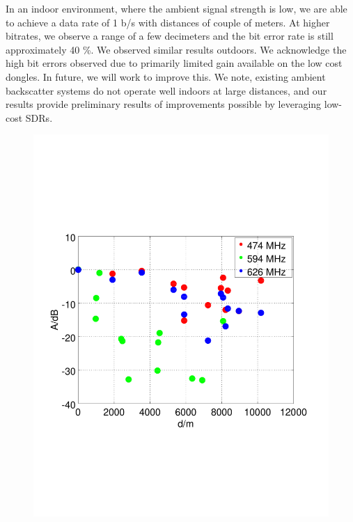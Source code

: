 In an indoor environment, where the ambient signal strength is low, we are
able to achieve a data rate of 1 b/s with distances of
couple of meters. At higher bitrates, we observe a range of a few decimeters and the  bit error rate is still approximately 40 \%. 
We observed similar results outdoors. We acknowledge the high bit errors
observed due to primarily limited gain available on the low cost dongles.
In future, we will work to improve this. We note, existing ambient backscatter
systems do not operate well indoors at large distances, and our results
provide preliminary results of  improvements possible by leveraging low-cost
SDRs.

\begin{figure}[h]
	\centering
	\begin{minipage}{0.49\columnwidth}
	\includegraphics[width=\columnwidth]{./fig/haversine}
	\end{minipage}
	\hfill
	\begin{minipage}{0.49\columnwidth}

\end{minipage}
\end{figure}
